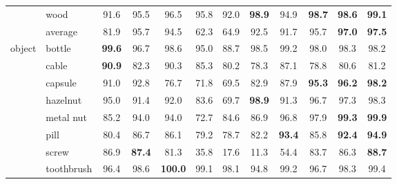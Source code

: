 \documentclass[final]{cvpr}
\begin{document}
\begin{table*}[t]
{\begin{tabular}{l|l|c|c|c||c|c|c|c|c|c|c}
    &   wood    &   91.6    &   95.5    &   96.5    &   95.8\scriptsize{} &    92.0\scriptsize{} &    \textbf{98.9}\scriptsize{} &    94.9\scriptsize{} &    \textbf{98.7}\scriptsize{} &    \textbf{98.6}\scriptsize{} &    \textbf{\color{red}99.1}    \\ \cmidrule{2-12}
    &   average &   81.9    &   95.7    &   94.5    &   62.3\scriptsize{} &    64.9\scriptsize{} &    92.5\scriptsize{} &    91.7\scriptsize{} &    95.7\scriptsize{} &    \textbf{97.0}\scriptsize{} &    \textbf{\color{red}97.5}    \\ \midrule
\multirow{11}{*}{object}    &   bottle  &   \textbf{99.6}    &   96.7    &   98.6    &   95.0\scriptsize{} &    88.7\scriptsize{} &    98.5\scriptsize{} &    99.2\scriptsize{} &    98.0\scriptsize{} &    98.3\scriptsize{} &    98.2    \\
    &   cable   &   \textbf{90.9}    &   82.3    &   90.3    &   85.3\scriptsize{} &    80.2\scriptsize{} &    78.3\scriptsize{} &    87.1\scriptsize{} &    78.8\scriptsize{} &    80.6\scriptsize{} &    81.2    \\
    &   capsule &   91.0    &   92.8    &   76.7    &   71.8\scriptsize{} &    69.5\scriptsize{} &    82.9\scriptsize{} &    87.9\scriptsize{} &    \textbf{95.3}\scriptsize{} &    \textbf{96.2}\scriptsize{} &    \textbf{\color{red}98.2}    \\
    &   hazelnut    &   95.0    &   91.4    &   92.0    &   83.6\scriptsize{} &    69.7\scriptsize{} &    \textbf{98.9}\scriptsize{} &    91.3\scriptsize{} &    96.7\scriptsize{} &    97.3\scriptsize{} &    98.3    \\
    &   metal nut   &   85.2    &   94.0    &   94.0    &   72.7\scriptsize{} &    84.6\scriptsize{} &    86.9\scriptsize{} &    96.8\scriptsize{} &    97.9\scriptsize{} &    \textbf{99.3}\scriptsize{} &    \textbf{\color{red}99.9}    \\
    &   pill    &   80.4    &   86.7    &   86.1    &   79.2\scriptsize{} &    78.7\scriptsize{} &    82.2\scriptsize{} &    \textbf{93.4}\scriptsize{} &    85.8\scriptsize{} &    \textbf{92.4}\scriptsize{} &    \textbf{\color{red}94.9}    \\
    &   screw   &   86.9    &   \textbf{87.4}    &   81.3    &   35.8\scriptsize{} &    17.6\scriptsize{} &    11.3\scriptsize{} &    54.4\scriptsize{} &    83.7\scriptsize{} &    86.3\scriptsize{} &    \textbf{\color{red}88.7}    \\
    &   toothbrush  &   96.4    &   98.6    &   \textbf{100.0}   &   99.1\scriptsize{} &    98.1\scriptsize{} &    94.8\scriptsize{} &    99.2\scriptsize{} &    96.7\scriptsize{} &    98.3\scriptsize{} &    99.4    \\

\end{tabular}}
\end{table*}
\end{document}
